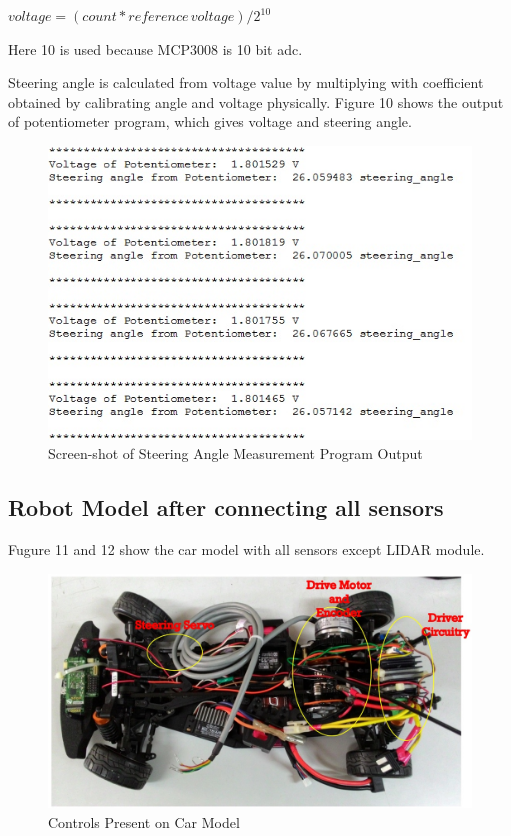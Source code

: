 \documentclass[conference]{IEEEtran}
\begin{document}
$ voltage = (count * reference \, voltage) / 2^{10} $ 

Here 10 is used because MCP3008 is 10 bit adc.

Steering angle is calculated from voltage value by multiplying with coefficient obtained by calibrating angle and voltage physically. Figure 10 shows the output of potentiometer program, which gives voltage and steering angle.


\begin{figure}[H]
\centering
\includegraphics[width=1\linewidth]{pot}
\caption{Screen-shot of Steering Angle Measurement Program Output}
\end{figure}

\subsection{Robot Model after connecting all sensors}
Fugure 11 and 12 show the car model with all sensors except LIDAR module.\cite{paper11} 

\begin{figure}[H]
\centering
\includegraphics[width=0.8\linewidth]{car0}
\caption{Controls Present on Car Model}
\end{figure}
\end{document}
